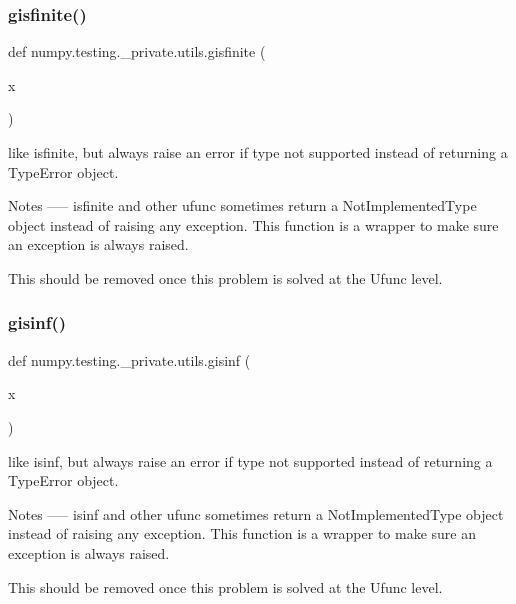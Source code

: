 \subsubsection{\texorpdfstring{gisfinite()}{gisfinite()}}
{\footnotesize\ttfamily def numpy.\+testing.\+\_\+private.\+utils.\+gisfinite (\begin{DoxyParamCaption}\item[{}]{x }\end{DoxyParamCaption})}

\begin{DoxyVerb}like isfinite, but always raise an error if type not supported instead
of returning a TypeError object.

Notes
-----
isfinite and other ufunc sometimes return a NotImplementedType object
instead of raising any exception. This function is a wrapper to make sure
an exception is always raised.

This should be removed once this problem is solved at the Ufunc level.\end{DoxyVerb}
 \mbox{\label{namespacenumpy_1_1testing_1_1__private_1_1utils_a38c10a33a076c0f16003c8d9e4beeaf4}} 
\subsubsection{\texorpdfstring{gisinf()}{gisinf()}}
{\footnotesize\ttfamily def numpy.\+testing.\+\_\+private.\+utils.\+gisinf (\begin{DoxyParamCaption}\item[{}]{x }\end{DoxyParamCaption})}

\begin{DoxyVerb}like isinf, but always raise an error if type not supported instead of
returning a TypeError object.

Notes
-----
isinf and other ufunc sometimes return a NotImplementedType object instead
of raising any exception. This function is a wrapper to make sure an
exception is always raised.

This should be removed once this problem is solved at the Ufunc level.\end{DoxyVerb}
 \mbox{\label{namespacenumpy_1_1testing_1_1__private_1_1utils_ad6d5793b0f5aae0566abcfe2c1b6be93}} 

